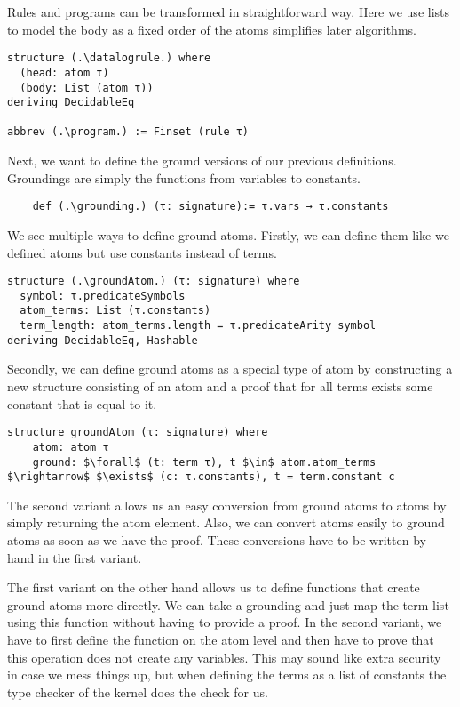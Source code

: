 Rules and programs can be transformed in straightforward way. Here we use lists to model the body as a fixed order of the atoms simplifies later algorithms.

\begin{lstlisting}
structure (.\datalogrule.) where
  (head: atom τ)
  (body: List (atom τ))
deriving DecidableEq

abbrev (.\program.) := Finset (rule τ)
\end{lstlisting}

Next, we want to define the ground versions of our previous definitions. Groundings are simply the functions from variables to constants.

\begin{lstlisting}
    def (.\grounding.) (τ: signature):= τ.vars → τ.constants
\end{lstlisting}

We see multiple ways to define ground atoms. Firstly, we can define them like we defined atoms but use constants instead of terms. 

\begin{lstlisting}
structure (.\groundAtom.) (τ: signature) where
  symbol: τ.predicateSymbols
  atom_terms: List (τ.constants)
  term_length: atom_terms.length = τ.predicateArity symbol
deriving DecidableEq, Hashable
\end{lstlisting}

Secondly, we can define ground atoms as a special type of atom by constructing a new structure consisting of an atom and a proof that for all terms exists some constant that is equal to it.

\begin{lstlisting}
structure groundAtom (τ: signature) where
    atom: atom τ
    ground: $\forall$ (t: term τ), t $\in$ atom.atom_terms $\rightarrow$ $\exists$ (c: τ.constants), t = term.constant c
\end{lstlisting}

The second variant allows us an easy conversion from ground atoms to atoms by simply returning the atom element. Also, we can convert atoms easily to ground atoms as soon as we have the proof. These conversions have to be written by hand in the first variant.

The first variant on the other hand allows us to define functions that create ground atoms more directly. We can take a grounding and just map the term list using this function without having to provide a proof. In the second variant, we have to first define the function on the atom level and then have to prove that this operation does not create any variables. This may sound like extra security in case we mess things up, but when defining the terms as a list of constants the type checker of the kernel does the check for us.

